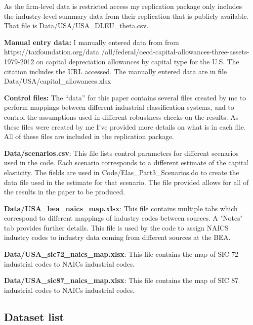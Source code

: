 \documentclass[
]{article}
\begin{document}
As the firm-level data is restricted access my replication package only includes the industry-level summary data from their replication that is publicly available. That file is Data/USA/USA\_DLEU\_theta.csv. 

\textbf{Manual entry data:}
I manually entered data from \cite{taxallow} from https://taxfoundation.org/data /all/federal/oecd-capital-allowances-three-assets-1979-2012 on capital depreciation allowances by capital type for the U.S. The citation includes the URL accessed. The manually entered data are in file Data/USA/capital\_allowances.xlsx

\textbf{Control files:}
The ``data'' for this paper contains several files created by me to perform mappings between different industrial classification systems, and to control the assumptions used in different robustness checks on the results. As these files were created by me I've provided more details on what is in each file. All of these files are included in the replication package.

\textbf{Data/scenarios.csv}: This file lists control parameters for different scenarios used in the code. Each scenario corresponds to a different estimate of the capital elasticity. The fields are used in Code/Elas\_Part3\_Scenarios.do to create the data file used in the estimate for that scenario. The file provided allows for all of the results in the paper to be produced. 

\textbf{Data/USA\_bea\_naics\_map.xlsx}: This file contains multiple tabs which correspond to different mappings of industry codes between sources. A "Notes" tab provides further details. This file is used by the code to assign NAICS industry codes to industry data coming from different sources at the BEA.

\textbf{Data/USA\_sic72\_naics\_map.xlsx}: This file contains the map of SIC 72 industrial codes to NAICs industrial codes. 

\textbf{Data/USA\_sic87\_naics\_map.xlsx}: This file contains the map of SIC 87 industrial codes to NAICs industrial codes. 


\hypertarget{dataset-list}{%
\subsection{Dataset list}\label{dataset-list}}
\end{document}
